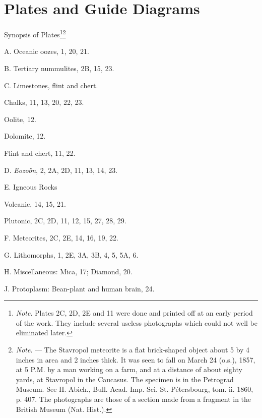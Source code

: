 \documentclass[a4paper, 12pt, oneside]{article}
\begin{document}
\section{Plates and Guide Diagrams}
\centerline{Synopsis of Plates\footnote{\emph{Note}. Plates 2C, 2D, 2E and 11 were done and printed off at an early period of the work. They include several useless photographs which could not well be eliminated later.}\footnote{\emph{Note}. --- The Stavropol meteorite is a flat brick-shaped object about 5 by 4 inches in area and 2 inches thick. It was seen to fall on March 24 (o.s.), 1857, at 5 P.M. by a man working on a farm, and at a distance of about eighty yards, at Stavropol in the Caucasus. The specimen is in the Petrograd Museum. See H. Abich., Bull. Acad. Imp. Sci. St. Pétersbourg, tom. ii. 1860, p. 407. The photographs are those of a section made from a fragment in the British Museum (Nat. Hist.).}}
\bigskip
\begin{description}
    \item A. Oceanic oozes, 1, 20, 21.
    \item B. Tertiary nummulites, 2B, 15, 23.
    \item C. Limestones, flint and chert.
    \item\hspace{15mm}Chalks, 11, 13, 20, 22, 23.
    \item\hspace{15mm}Oolite, 12.
    \item\hspace{15mm}Dolomite, 12.
    \item\hspace{15mm}Flint and chert, 11, 22.
    \item D. \emph{Eozoön}, 2, 2A, 2D, 11, 13, 14, 23.
    \item E. Igneous Rocks
    \item\hspace{15mm}Volcanic, 14, 15, 21.
    \item\hspace{15mm}Plutonic, 2C, 2D, 11, 12, 15, 27, 28, 29.
    \item F. Meteorites, 2C, 2E, 14, 16, 19, 22.
    \item G. Lithomorphs, 1, 2E, 3A, 3B, 4, 5, 5A, 6.
    \item H. Miscellaneous: Mica, 17; Diamond, 20.
    \item J. Protoplasm: Bean-plant and human brain, 24.
\end{description}
\end{document}
